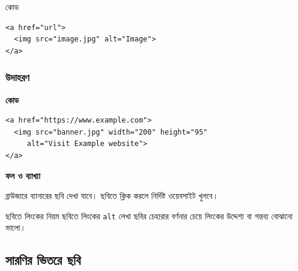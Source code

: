 \begin{examplebox}{কোড}
\par\noindent\begin{minipage}{\linewidth}
\begin{verbatim}
<a href="url">
  <img src="image.jpg" alt="Image">
</a>
\end{verbatim}
\end{minipage}\par
\end{examplebox}

\subsubsection{উদাহরণ}

\par\noindent
\begin{minipage}[t]{.54\linewidth}\vspace{0pt}\small
\textbf{\color{chFourTeal}কোড}\par
\begin{verbatim}
<a href="https://www.example.com">
  <img src="banner.jpg" width="200" height="95"
     alt="Visit Example website">
</a>
\end{verbatim}

\par\smallskip
\end{minipage}\hfill
\begin{minipage}[t]{.42\linewidth}\vspace{0pt}\small
\textbf{\color{chFourTeal}ফল ও ব্যাখ্যা}\par
ব্রাউজারে ব্যানারের ছবি দেখা যাবে। ছবিতে ক্লিক করলে নির্দিষ্ট ওয়েবসাইট খুলবে।
\par\smallskip
\end{minipage}\par


\begin{keypointbox}{ছবিতে লিংকের নিয়ম}
ছবিতে লিংকের \texttt{alt} লেখা ছবির চেহারার বর্ণনার চেয়ে লিংকের উদ্দেশ্য বা গন্তব্য বোঝানো ভালো।
\end{keypointbox}





\subsection{সারণির ভিতরে ছবি}

